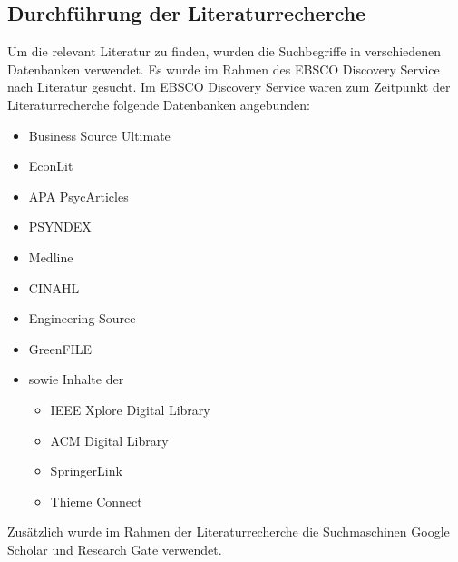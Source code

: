 \subsection{Durchführung der Literaturrecherche}
Um die relevant Literatur zu finden, wurden die Suchbegriffe in verschiedenen Datenbanken verwendet.
Es wurde im Rahmen des EBSCO Discovery Service nach Literatur gesucht.
Im EBSCO Discovery Service waren zum Zeitpunkt der Literaturrecherche folgende Datenbanken angebunden:
\begin{itemize}
    \item Business Source Ultimate
    \item EconLit
    \item APA PsycArticles
    \item PSYNDEX
    \item Medline
    \item CINAHL
    \item Engineering Source
    \item GreenFILE
    \item sowie Inhalte der \begin{itemize}
              \item IEEE Xplore Digital Library
              \item ACM Digital Library
              \item SpringerLink
              \item Thieme Connect
          \end{itemize}
\end{itemize}

Zusätzlich wurde im Rahmen der Literaturrecherche die Suchmaschinen Google Scholar und Research Gate verwendet.

